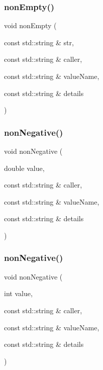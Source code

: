 \subsubsection{\texorpdfstring{non\+Empty()}{nonEmpty()}}
{\footnotesize\ttfamily void non\+Empty (\begin{DoxyParamCaption}\item[{const std\+::string \&}]{str,  }\item[{const std\+::string \&}]{caller,  }\item[{const std\+::string \&}]{value\+Name,  }\item[{const std\+::string \&}]{details }\end{DoxyParamCaption})}

\mbox{\label{namespacerequire_a1ea7fb60c9f1e4facc46b4fba5e0a924}} 
\subsubsection{\texorpdfstring{non\+Negative()}{nonNegative()}\hspace{0.1cm}{\footnotesize\ttfamily [1/2]}}
{\footnotesize\ttfamily void non\+Negative (\begin{DoxyParamCaption}\item[{double}]{value,  }\item[{const std\+::string \&}]{caller,  }\item[{const std\+::string \&}]{value\+Name,  }\item[{const std\+::string \&}]{details }\end{DoxyParamCaption})}

\mbox{\label{namespacerequire_a40cad20a5826d829aaf4083c27175b05}} 
\subsubsection{\texorpdfstring{non\+Negative()}{nonNegative()}\hspace{0.1cm}{\footnotesize\ttfamily [2/2]}}
{\footnotesize\ttfamily void non\+Negative (\begin{DoxyParamCaption}\item[{int}]{value,  }\item[{const std\+::string \&}]{caller,  }\item[{const std\+::string \&}]{value\+Name,  }\item[{const std\+::string \&}]{details }\end{DoxyParamCaption})}

